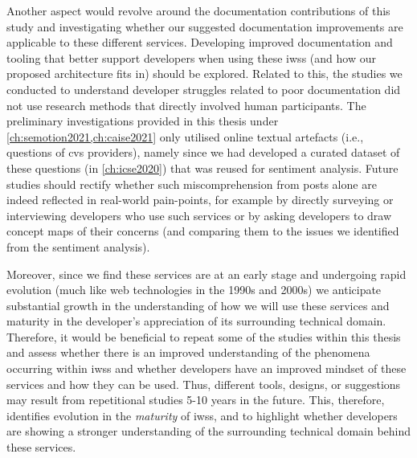 Another aspect would revolve around the documentation contributions of this study and investigating whether our suggested documentation improvements are applicable to these different services. Developing improved documentation and tooling that better support developers when using these \glspl{iws} (and how our proposed architecture fits in) should be explored. Related to this, the studies we conducted to understand developer struggles related to poor documentation did not use research methods that directly involved human participants. The preliminary investigations provided in this thesis under \cref{ch:semotion2021,ch:caise2021} only utilised online textual artefacts (i.e.,  questions of \gls{cvs} providers), namely since we had developed a curated dataset of these questions (in \cref{ch:icse2020}) that was reused for sentiment analysis. Future studies should rectify whether such miscomprehension from  posts alone are indeed reflected in real-world pain-points, for example by directly surveying or interviewing developers who use such services or by asking developers to draw concept maps of their concerns (and comparing them to the issues we identified from the sentiment analysis). 

Moreover, since we find these services are at an early stage and undergoing rapid evolution (much like web technologies in the 1990s and 2000s) we anticipate substantial growth in the understanding of how we will use these services and maturity in the developer's appreciation of its surrounding technical domain. Therefore, it would be beneficial to repeat some of the studies within this thesis and assess whether there is an improved understanding of the phenomena occurring within \glspl{iws} and whether developers have an improved mindset of these services and how they can be used. Thus, different tools, designs, or suggestions may result from repetitional studies 5-10 years in the future. This, therefore, identifies evolution in the \textit{maturity} of \glspl{iws}, and to highlight whether developers are showing a stronger understanding of the surrounding technical domain behind these services.

